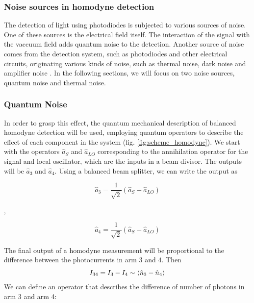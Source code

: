 \begin{bibunit}[plain]
\subsubsection{Noise sources in homodyne detection}
The detection of light using photodiodes is subjected to various sources of noise. One of these sources is the electrical field itself. The interaction of the signal with the vaccuum field adds quantum noise to the detection.
Another source of noise comes from the detection system, such as photodiodes and other electrical circuits, originating various kinds of noise, such as thermal noise, dark noise and amplifier noise
\cite{hans2004}.
In the following sections, we will focus on two noise sources, quantum noise and thermal noise.
%
%
%
\subsubsection{Quantum Noise}
In order to grasp this effect, the quantum mechanical description of balanced homodyne detection will be used, employing quantum operators to describe the effect of each component in the system (fig. \ref{fig:scheme_homodyne}). We start with the operators $\hat{a}_S$ and $\hat{a}_{LO}$ corresponding to the annihilation operator for the signal and local oscillator, which are the inputs in a beam divisor. The outputs will be $\hat{a}_3$ and $\hat{a}_4$.
Using a balanced beam splitter, we can write the output as
%
\begin{center}
	\begin{minipage}{48mm}
		\noindent
		\begin{equation}
			\hat{a}_3 = \frac{1}{\sqrt{2}} \left( \hat{a}_S + \hat{a}_{LO} \right)
		\end{equation}
	\end{minipage}
	$,\quad$
	\begin{minipage}{48mm}
		\noindent
		\begin{equation}
			\hat{a}_4 = \frac{1}{\sqrt{2}} \left( \hat{a}_S - \hat{a}_{LO} \right)
		\end{equation}
	\end{minipage}
\end{center}
%
The final output of a homodyne measurement will be proportional to the difference between the photocurrents in arm $3$ and $4$. Then
%
\begin{equation}
I_{34} = I_3 - I_4 \sim \braket{\hat{n}_3 - \hat{n}_4}
\end{equation}
%
We can define an operator that describes the difference of number of photons in arm 3 and arm 4:

\end{bibunit}

